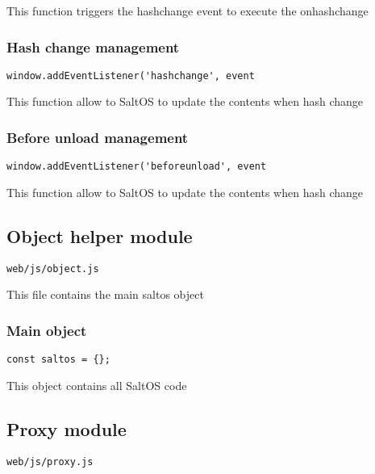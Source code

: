 \documentclass[a4paper]{article}
\begin{document}
This function triggers the hashchange event to execute the onhashchange

\hypertarget{toc815}{}
\subsubsection{Hash change management}

\begin{lstlisting}
window.addEventListener('hashchange', event
\end{lstlisting}

This function allow to SaltOS to update the contents when hash change

\hypertarget{toc816}{}
\subsubsection{Before unload management}

\begin{lstlisting}
window.addEventListener('beforeunload', event
\end{lstlisting}

This function allow to SaltOS to update the contents when hash change

\hypertarget{toc817}{}
\subsection{Object helper module}

\begin{lstlisting}
web/js/object.js
\end{lstlisting}

This file contains the main saltos object

\hypertarget{toc818}{}
\subsubsection{Main object}

\begin{lstlisting}
const saltos = {};
\end{lstlisting}

This object contains all SaltOS code

\hypertarget{toc819}{}
\subsection{Proxy module}

\begin{lstlisting}
web/js/proxy.js
\end{lstlisting}
\end{document}
